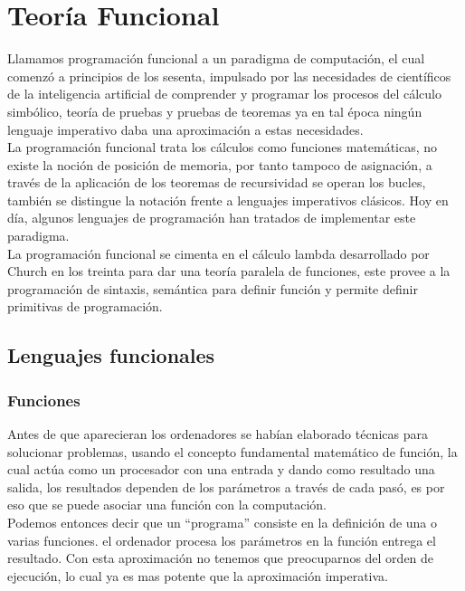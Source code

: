 
\chapter{Teoría Funcional}

Llamamos programación funcional a un paradigma de computación, el cual comenzó a principios de los sesenta, impulsado por las necesidades de científicos de la inteligencia artificial de comprender y programar los procesos del cálculo simbólico, teoría de pruebas y pruebas de teoremas ya en tal época ningún lenguaje imperativo daba una aproximación a estas necesidades.\\
La programación funcional trata los cálculos como funciones matemáticas, no existe la noción de posición de memoria, por tanto tampoco de asignación, a través de la aplicación de los teoremas de recursividad se operan los bucles, también se distingue la notación frente a lenguajes imperativos clásicos. Hoy en día, algunos lenguajes de programación han tratados de implementar este paradigma.\\
La programación funcional se cimenta en el cálculo lambda desarrollado por Church en los treinta para dar una teoría paralela de funciones, este provee a la programación de sintaxis, semántica para definir función y permite definir primitivas de programación.

\section{Lenguajes funcionales}

\subsection{Funciones}

Antes de que aparecieran los ordenadores se habían elaborado técnicas para solucionar problemas,  usando el concepto fundamental matemático de función, la cual actúa como un procesador con una entrada y dando como resultado una salida, los resultados dependen de los parámetros a través de cada pasó, es por eso que se puede asociar una función con la computación.\\

Podemos entonces decir que un ``programa'' consiste en la definición de una o varias funciones.  el ordenador procesa los parámetros en la función  entrega el resultado. Con esta aproximación no tenemos que preocuparnos del orden de ejecución, lo cual ya es mas potente que la aproximación imperativa.

